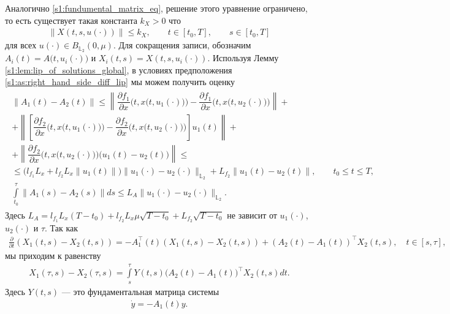 \documentclass[../main.tex]{subfiles}
\begin{document}
Аналогично \eqref{s1:fundumental_matrix_eq}, решение этого уравнение ограничено, то есть существует такая константа $k_X>0$ что
\begin{gather*}
    \| X(t,s, u(\cdot)) \| \leqslant k_X, \qquad t \in [t_0,T], \qquad s \in [t_0,T]
\end{gather*}
для всех $u(\cdot) \in B_{\mathbb{L}_2}(0,\mu)$. 
Для сокращения записи, обозначим $A_i(t) = A\big(t, u_i(\cdot)\big) $ и $ X_i(t,s) = X(t, s, u_i(\cdot))$. 
Используя Лемму \ref{s1:lem:lip_of_solutions_global}, в условиях предположения \ref{s1:as:right_hand_side_diff_lip} мы можем получить оценку
\begin{gather}\label{s1:lip_a}
\begin{gathered}
    \| A_1(t) - A_2(t) \| \leqslant 
    \left\| \dfrac{\partial f_1}{\partial x} \Big(t,x\big(t,u_1(\cdot)\big)\Big) - \dfrac{\partial f_1}{\partial x} \Big(t,x\big(t,u_2(\cdot)\big)\Big) \right\| + \\ +
    \left\| \left[ \dfrac{\partial f_2}{\partial x}\Big(t,x\big(t,u_1(\cdot)\big)\Big)  - \dfrac{\partial f_2}{\partial x}\Big(t,x\big(t,u_2(\cdot)\big)\Big) \right] u_1(t) \right\| + \\ +
    \left\| \dfrac{\partial f_2}{\partial x}\Big(t,x\big(t,u_2(\cdot)\big)\Big) \Big(u_1(t) - u_2(t)\Big) \right\| \leqslant \\ \leqslant
    \Big(l_{f_1} L_x  + l_{f_2} L_x \|u_1(t) \|\Big) \| u_1(\cdot) - u_2(\cdot) \|_{\mathbb{L}_2} +  L_{f_2} \| u_1(t) - u_2(t) \|, \qquad t_0 \leqslant t \leqslant T,\\
    \int\limits_{t_0}^{\tau} \|A_1(s) - A_2(s) \| ds \leqslant L_A \| u_1(\cdot) - u_2(\cdot) \|_{\mathbb{L}_2}. 
\end{gathered}
\end{gather}
Здесь $L_A = l_{f_1} L_x (T - t_0) + l_{f_2} L_x \mu \sqrt{T - t_0} + L_{f_2} \sqrt{T - t_0}$ не зависит от $u_1(\cdot)$, $u_2(\cdot)$ и $\tau$.
Так как
\begin{gather*}
    \frac{\partial}{\partial t} \left(X_1(t,s) - X_2(t,s) \right) = -A_1^{\top}(t) \left(X_1(t,s) - X_2(t,s) \right) + (A_2(t) - A_1(t))^{\top} X_2(t,s), \quad t \in [s,\tau], 
\end{gather*}
мы приходим к равенству
\begin{gather*}
    X_1(\tau,s) - X_2(\tau,s) = \int\limits_s^{\tau} Y(t,s) \big(A_2(t) - A_1(t)\big)^{\top} X_2(t,s) dt.
\end{gather*}
Здесь $Y(t,s)$ --- это фундаментальная матрица системы 
\begin{gather*}
    \dot{y} = -A_1(t) y.
\end{gather*}
\end{document}
